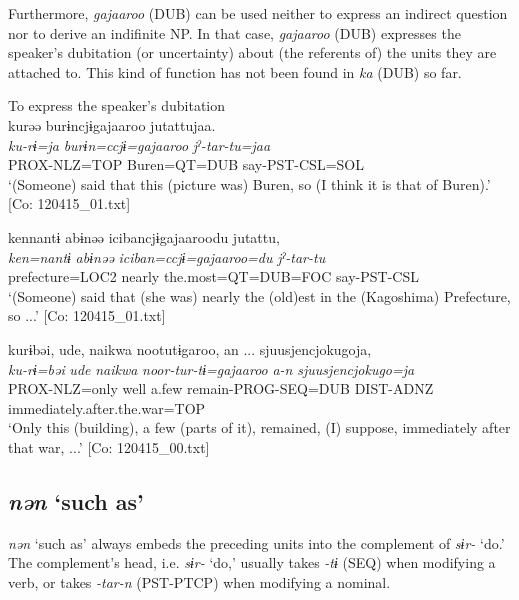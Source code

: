 \begin{xlist}
Furthermore, \textit{gajaaroo} (DUB) can be used neither to express an indirect question nor to derive an indifinite NP. In that case, \textit{gajaaroo} (DUB) expresses the speaker’s dubitation (or uncertainty) about (the referents of) the units they are attached to. This kind of function has not been found in \textit{ka} (DUB) so far.

\ea\label{ex:10.84}   To express the speaker’s dubitation\\
  \ea  %
      \glll    kurəə  burɨncjɨgajaaroo  jutattujaa.\\
      \textit{ku-rɨ=ja}  \textit{burɨn=ccjɨ=gajaaroo}  \textit{jˀ-tar-tu=jaa}\\
      PROX-NLZ=TOP  Buren=QT=DUB  say-PST-CSL=SOL\\
      \glt       ‘(Someone) said that this (picture was) Buren, so (I think it is that of Buren).’ [Co: 120415\_01.txt]

  \ex  %
      \glll    {\textbar}ken{\textbar}nantɨ  abɨnəə  {\textbar}iciban{\textbar}cjɨgajaaroodu  jutattu,\\
      \textit{ken=nantɨ}  \textit{abɨnəə}  \textit{iciban=ccjɨ=gajaaroo=du}  \textit{jˀ-tar-tu}\\
      prefecture=LOC2  nearly  the.most=QT=DUB=FOC  say-PST-CSL\\
      \glt       ‘(Someone) said that (she was) nearly the (old)est in the (Kagoshima) Prefecture, so ...’ [Co: 120415\_01.txt]

  \ex  %
      \glll    kurɨbəi,  ude,  naikwa  nootutɨgaroo,  an ...  {\textbar}sjuusjencjokugo{\textbar}ja,\\
      \textit{ku-rɨ=bəi}  \textit{ude}  \textit{naikwa}  \textit{noor-tur-tɨ=gajaaroo}  \textit{a-n}  \textit{sjuusjencjokugo=ja}  \\
      PROX-NLZ=only  well  a.few  remain-PROG-SEQ=DUB  DIST-ADNZ  immediately.after.the.war=TOP        \\
      \glt       ‘Only this (building), a few (parts of it), remained, (I) suppose, immediately after that war, ...’ [Co: 120415\_00.txt]
    \z
\z

\subsection{\textit{nən} ‘such as’}\label{sec:10.4.4}

\textit{nən} ‘such as’ always embeds the preceding units into the complement of \textit{sɨr-} ‘do.’ The complement’s head, i.e. \textit{sɨr-} ‘do,’ usually takes \textit{{}-tɨ} (SEQ) when modifying a verb, or takes \textit{-tar-n} (PST-PTCP) when modifying a nominal.


\end{xlist}
